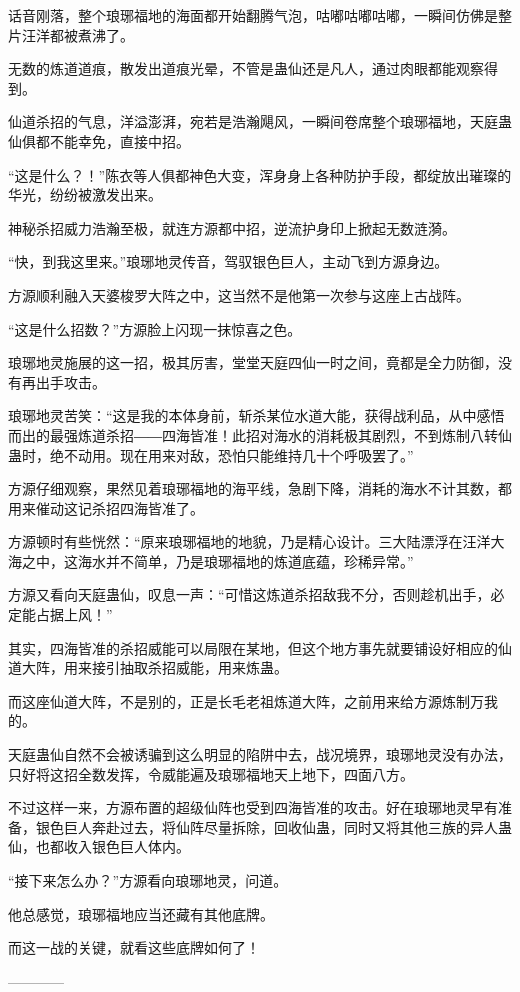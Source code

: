 \begin{this_body}
话音刚落，整个琅琊福地的海面都开始翻腾气泡，咕嘟咕嘟咕嘟，一瞬间仿佛是整片汪洋都被煮沸了。

无数的炼道道痕，散发出道痕光晕，不管是蛊仙还是凡人，通过肉眼都能观察得到。

仙道杀招的气息，洋溢澎湃，宛若是浩瀚飓风，一瞬间卷席整个琅琊福地，天庭蛊仙俱都不能幸免，直接中招。

“这是什么？！”陈衣等人俱都神色大变，浑身身上各种防护手段，都绽放出璀璨的华光，纷纷被激发出来。

神秘杀招威力浩瀚至极，就连方源都中招，逆流护身印上掀起无数涟漪。

“快，到我这里来。”琅琊地灵传音，驾驭银色巨人，主动飞到方源身边。

方源顺利融入天婆梭罗大阵之中，这当然不是他第一次参与这座上古战阵。

“这是什么招数？”方源脸上闪现一抹惊喜之色。

琅琊地灵施展的这一招，极其厉害，堂堂天庭四仙一时之间，竟都是全力防御，没有再出手攻击。

琅琊地灵苦笑：“这是我的本体身前，斩杀某位水道大能，获得战利品，从中感悟而出的最强炼道杀招――四海皆准！此招对海水的消耗极其剧烈，不到炼制八转仙蛊时，绝不动用。现在用来对敌，恐怕只能维持几十个呼吸罢了。”

方源仔细观察，果然见着琅琊福地的海平线，急剧下降，消耗的海水不计其数，都用来催动这记杀招四海皆准了。

方源顿时有些恍然：“原来琅琊福地的地貌，乃是精心设计。三大陆漂浮在汪洋大海之中，这海水并不简单，乃是琅琊福地的炼道底蕴，珍稀异常。”

方源又看向天庭蛊仙，叹息一声：“可惜这炼道杀招敌我不分，否则趁机出手，必定能占据上风！”

其实，四海皆准的杀招威能可以局限在某地，但这个地方事先就要铺设好相应的仙道大阵，用来接引抽取杀招威能，用来炼蛊。

而这座仙道大阵，不是别的，正是长毛老祖炼道大阵，之前用来给方源炼制万我的。

天庭蛊仙自然不会被诱骗到这么明显的陷阱中去，战况境界，琅琊地灵没有办法，只好将这招全数发挥，令威能遍及琅琊福地天上地下，四面八方。

不过这样一来，方源布置的超级仙阵也受到四海皆准的攻击。好在琅琊地灵早有准备，银色巨人奔赴过去，将仙阵尽量拆除，回收仙蛊，同时又将其他三族的异人蛊仙，也都收入银色巨人体内。

“接下来怎么办？”方源看向琅琊地灵，问道。

他总感觉，琅琊福地应当还藏有其他底牌。

而这一战的关键，就看这些底牌如何了！

------------

\end{this_body}

